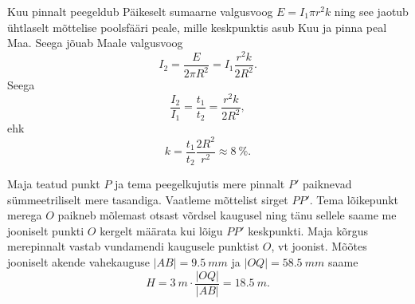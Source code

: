 \documentclass[10pt]{article}
\begin{document}
{Kuu pinnalt peegeldub Päikeselt sumaarne valgusvoog $E = I_1 \pi r^2k$ ning see jaotub ühtlaselt mõttelise poolsfääri peale, mille keskpunktis asub Kuu ja pinna peal Maa. Seega jõuab Maale valgusvoog
\[
I_2 = \frac{E}{2\pi R^2} = I_1 \frac{r^2k}{2R^2}.
\]
Seega
\[
\frac{I_2}{I_1} = \frac{t_1}{t_2} = \frac{r^2k}{2R^2},
\]
ehk
\[
k = \frac{t_1}{t_2} \frac{2R^2}{r^2} \approx \SI{8}{\%}.
\]
\probend
\bigskip


\solu
Maja teatud punkt $P$ ja tema peegelkujutis mere pinnalt $P'$ paiknevad sümmeetriliselt mere tasandiga. Vaatleme mõttelist sirget $PP'$. Tema lõikepunkt merega $O$ paikneb mõlemast otsast võrdsel kaugusel ning tänu sellele saame me jooniselt punkti $O$ kergelt määrata kui lõigu $PP'$ keskpunkti. Maja kõrgus merepinnalt vastab vundamendi kaugusele punktist $O$, vt joonist. Mõõtes jooniselt akende vahekauguse $|AB| = \SI{9,5}{mm}$ ja $|OQ| = \SI{58,5}{mm}$ saame
\[
H = \SI{3}{m} \cdot \frac{|OQ|}{|AB|} = \SI{18,5}{m}.
\]

}
\end{document}
